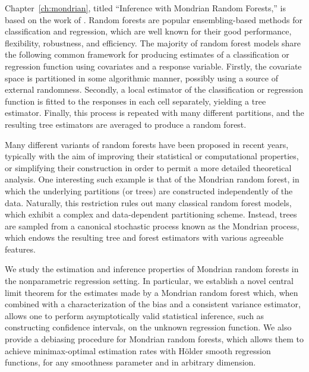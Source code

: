 \documentclass[11pt,lof]{puthesis}
\theoremstyle{break}
\theoremstyle{proof}
\begin{document}
Chapter~\ref{ch:mondrian}, titled ``Inference with Mondrian Random Forests,''
is based on the work of \citet{cattaneo2023inference}.
Random forests are popular ensembling-based methods for classification and
regression, which are well known for their good performance, flexibility,
robustness, and efficiency. The majority of random forest models share the
following common framework for producing estimates of a classification or
regression function using covariates and a response variable. Firstly, the
covariate space is partitioned in some algorithmic manner, possibly using a
source of external randomness. Secondly, a local estimator of the
classification or regression function is fitted to the responses in each cell
separately, yielding a tree estimator. Finally, this process is repeated with
many different partitions, and the resulting tree estimators are averaged to
produce a random forest.

Many different variants of random forests have been proposed in recent years,
typically with the aim of improving their statistical or computational
properties, or simplifying their construction in order to permit a more
detailed theoretical analysis.
One interesting such example is that of the Mondrian random forest, in which
the underlying partitions (or trees) are constructed independently of the data.
Naturally, this restriction rules out many classical random forest models, which
exhibit a complex and data-dependent partitioning scheme. Instead, trees are
sampled from a canonical stochastic process known as the Mondrian process,
which endows the resulting tree and forest estimators with various agreeable
features.

We study the estimation and inference properties of Mondrian
random forests in the nonparametric regression setting. In particular, we
establish a novel central limit theorem for the estimates made by a Mondrian
random forest which, when combined with a characterization of the bias and a
consistent variance estimator, allows one to perform asymptotically valid
statistical inference, such as constructing confidence intervals, on the
unknown regression function. We also provide a debiasing procedure for Mondrian
random forests, which allows them to achieve minimax-optimal estimation rates
with H{\"o}lder smooth regression functions, for any smoothness parameter and
in arbitrary dimension.
\end{document}
